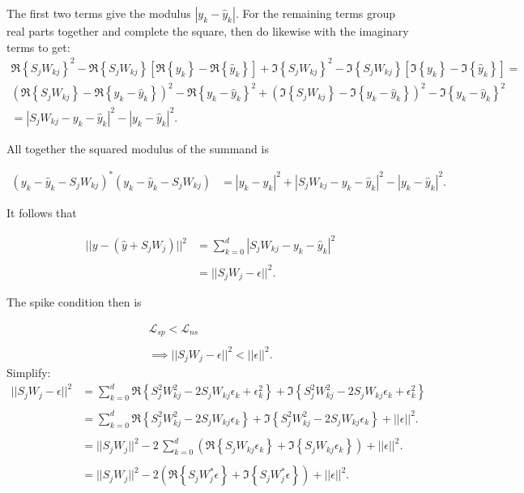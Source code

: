 The first two terms give the modulus $|y_k - \hat{y}_k|$. For the remaining terms group real parts together and complete the square, then do likewise with the imaginary terms to get:
\begin{multline*}
\Re{\left\{ S_j W_{kj} \right\}}^2  -\Re{\left\{ S_j W_{kj} \right\}}\left[\Re{\left\{ y_k \right\}}-\Re{\left\{ \hat{y}_k \right\}}\right]+ \Im{\left\{ S_j W_{kj} \right\}}^2-\Im{\left\{ S_j W_{kj} \right\}}\left[\Im{\left\{ y_k \right\}}-\Im{\left\{ \hat{y}_k \right\}}\right] =
\\
\left(\Re\left\{S_j W_{kj} \right\} - \Re\left\{ y_k-\hat{y}_k\right\} \right)^2 -  \Re\left\{ y_k-\hat{y}_k
\right\}^2
+
\left(\Im\left\{S_j W_{kj} \right\} - \Im\left\{ y_k-\hat{y}_k\right\} \right)^2 -  \Im\left\{ y_k-\hat{y}_k
\right\}^2
\\
=
\left|S_j W_{kj}-y_k-\hat{y}_k\right|^2 - \left|y_k-\hat{y}_k\right|^2.
\end{multline*}

All together the squared modulus of the summand is

\begin{align*}
\left(y_k - \hat{y}_k - S_j W_{kj} \right)^*\left(y_k - \hat{y}_k - S_j W_{kj} \right)
&=
\left|y_k - \hat{y}_k\right|^2 + \left|S_j W_{kj}- y_k-\hat{y}_k\right|^2 - \left|y_k-\hat{y}_k\right|^2. 
\end{align*}

It follows that 

\begin{align*}
||y - \left(\hat{y} + S_j W_j\right)||^2 
&=
\sum_{k=0}^{d} \left|S_j W_{kj}- y_k-\hat{y}_k\right|^2 
\\
\\
&=
||S_j W_j-\epsilon||^2 .
\end{align*}

The spike condition then is

\begin{align*}
\mathcal{L}_{sp} < \mathcal{L}_{ns}
\\
\\
\implies
||S_j W_j-\epsilon||^2 < ||\epsilon||^2.
\end{align*}
Simplify:
\begin{align*}
||S_j W_j-\epsilon||^2
&=
\sum_{k=0}^{d} 
\Re\left\{S_j^2 W_{kj}^2 - 2 S_j W_{kj}\epsilon_k + \epsilon_k^2\right\}
+
\Im\left\{S_j^2 W_{kj}^2 - 2 S_j W_{kj}\epsilon_k + \epsilon_k^2\right\}
\\
\\
&=
\sum_{k=0}^{d} 
\Re\left\{S_j^2 W_{kj}^2 - 2 S_j W_{kj}\epsilon_k\right\}
+
\Im\left\{S_j^2 W_{kj}^2 - 2 S_j W_{kj}\epsilon_k\right\} + ||\epsilon||^2.
\\
\\
&=
||S_jW_j||^2
-2 \, \sum_{k=0}^{d} 
\left(
\Re\left\{S_j W_{kj}\epsilon_k\right\}
+
\Im\left\{S_j W_{kj}\epsilon_k\right\}
\right)
 + ||\epsilon||^2.
 \\
 \\
 &= 
||S_jW_j||^2
-2 
\left(
\Re \left\{S_jW_j^*\epsilon\right\}
+
\Im \left\{S_jW_j^*\epsilon\right\}
\right)
 + ||\epsilon||^2.
\end{align*}

